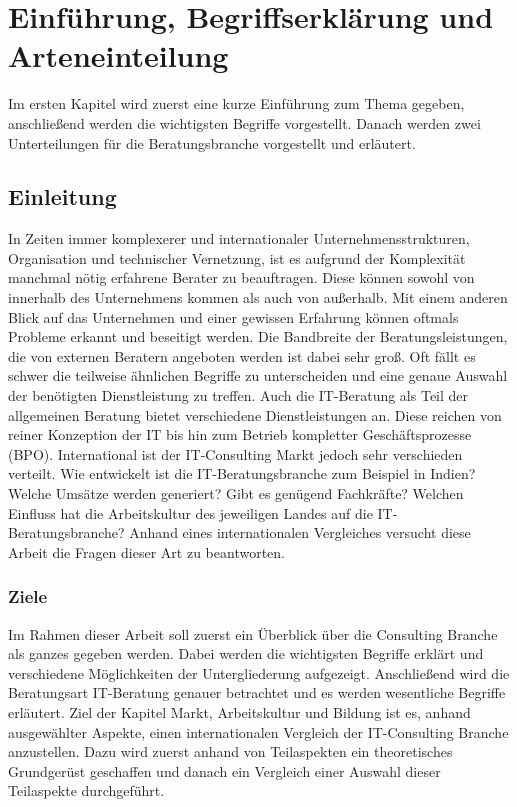 \chapter{Einführung, Begriffserklärung und Arteneinteilung}
Im ersten Kapitel wird zuerst eine kurze Einführung zum Thema gegeben, anschließend werden die wichtigsten Begriffe vorgestellt. Danach werden zwei Unterteilungen für die Beratungsbranche vorgestellt und erläutert.
\section{Einleitung}
In Zeiten immer komplexerer und internationaler Unternehmensstrukturen, Organisation und technischer Vernetzung, ist es aufgrund der Komplexität manchmal nötig erfahrene Berater zu beauftragen. Diese können sowohl von innerhalb des Unternehmens kommen als auch von außerhalb. Mit einem anderen Blick auf das Unternehmen und einer gewissen Erfahrung können oftmals Probleme erkannt und beseitigt werden. Die Bandbreite der Beratungsleistungen, die von externen Beratern angeboten werden ist dabei sehr groß. Oft fällt es schwer die teilweise ähnlichen Begriffe zu unterscheiden und eine genaue Auswahl der benötigten Dienstleistung zu treffen. Auch die IT-Beratung als Teil der allgemeinen Beratung bietet verschiedene Dienstleistungen an. Diese reichen von reiner Konzeption der IT bis hin zum Betrieb kompletter Geschäftsprozesse (BPO). International ist der IT-Consulting Markt jedoch sehr verschieden verteilt. Wie entwickelt ist die IT-Beratungsbranche zum Beispiel in Indien? Welche Umsätze werden generiert? Gibt es genügend Fachkräfte? Welchen Einfluss hat die Arbeitskultur des jeweiligen Landes auf die IT-Beratungsbranche? Anhand eines internationalen Vergleiches versucht diese Arbeit die Fragen dieser Art zu beantworten.

\subsection*{Ziele}
Im Rahmen dieser Arbeit soll zuerst ein Überblick über die Consulting Branche als ganzes gegeben werden. Dabei werden die wichtigsten Begriffe erklärt und verschiedene Möglichkeiten der Untergliederung aufgezeigt. Anschließend wird die Beratungsart IT-Beratung genauer betrachtet und es werden wesentliche Begriffe erläutert. Ziel der Kapitel Markt, Arbeitskultur und Bildung ist es, anhand ausgewählter Aspekte, einen internationalen Vergleich der IT-Consulting Branche anzustellen. Dazu wird zuerst anhand von Teilaspekten ein theoretisches Grundgerüst geschaffen und danach ein Vergleich einer Auswahl dieser Teilaspekte durchgeführt.
